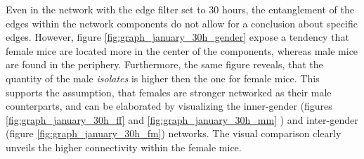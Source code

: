 Even in the network with the edge filter set to 30 hours, the entanglement of the edges within the network components do not allow for a conclusion about specific edges. However, figure \ref{fig:graph_january_30h_gender} expose a tendency that female mice are located more in the center of the components, whereas male mice are found in the periphery. Furthermore, the same figure reveals, that the quantity of the male \textit{isolates} is higher then the one for female mice. This supports the assumption, that females are stronger networked as their male counterparts, and can be elaborated by visualizing the inner-gender (figures \ref{fig:graph_january_30h_ff} and \ref{fig:graph_january_30h_mm} ) and inter-gender (figure \ref{fig:graph_january_30h_fm}) networks. The visual comparison clearly unveils the higher connectivity within the female mice.


